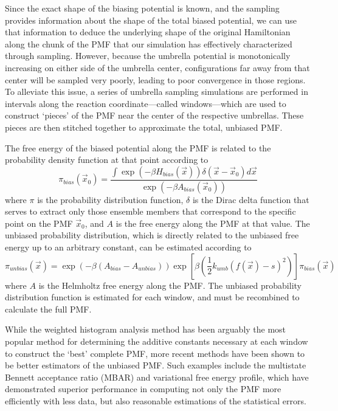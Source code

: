 Since the exact shape of the biasing potential is known, and the sampling
provides information about the shape of the total biased potential, we can use
that information to deduce the underlying shape of the original Hamiltonian
along the chunk of the PMF that our simulation has effectively characterized
through sampling. However, because the umbrella potential is monotonically
increasing on either side of the umbrella center, configurations far away from
that center will be sampled very poorly, leading to poor convergence in those
regions. To alleviate this issue, a series of umbrella sampling simulations are
performed in intervals along the reaction coordinate---called windows---which
are used to construct `pieces' of the PMF near the center of the respective
umbrellas. These pieces are then stitched together to approximate the total,
unbiased PMF.

The free energy of the biased potential along the PMF is related to the
probability density function at that point according to
\begin{equation*}
   \pi_{bias}(\vec{x}_0) = \frac {\int \exp \left( -\beta H_{bias} (\vec{x})
         \right) \delta (\vec{x} - \vec{x}_0) d\vec{x}}
         {\exp\left(-\beta A_{bias}(\vec{x}_0)\right)}
\end{equation*}
where $\pi$ is the probability distribution function, $\delta$ is the Dirac
delta function that serves to extract only those ensemble members that
correspond to the specific point on the PMF $\vec{x}_0$, and $A$ is the free
energy along the PMF at that value. The unbiased probability distribution, which
is directly related to the unbiased free energy up to an arbitrary constant, can
be estimated according to \cite{Tuckerman_Book_StatMech_TheoryAndSim}
\begin{equation*}
   \pi_{unbias}(\vec{x}) = \exp\left(-\beta(A_{bias}-A_{unbias}) \right)
                  \exp\left[\beta\left(\frac 1 2 k_{umb}(f(\vec{x})-s)^2 \right)
                  \right] \pi_{bias}(\vec{x})
\end{equation*}
where $A$ is the Helmholtz free energy along the PMF. The unbiased probability
distribution function is estimated for each window, and must be recombined to
calculate the full PMF. \cite{Tuckerman_Book_StatMech_TheoryAndSim}

While the weighted histogram analysis method has been arguably the most popular
method for determining the additive constants necessary at each window to
construct the `best' complete PMF, \cite{Grossfield_WHAM_2005} more recent
methods have been shown to be better estimators of the unbiased PMF. Such
examples include the multistate Bennett acceptance ratio (MBAR)
\cite{Shirts_JChemPhys_2008_v129_p124105} and variational free energy
profile, \cite{Lee_JChemTheoryComput_2013_v9_p153} which have demonstrated
superior performance in computing not only the PMF more efficiently with less
data, \cite{Lee_JChemTheoryComput_2013_v9_p153} but also reasonable estimations
of the statistical errors. \cite{Shirts_JChemPhys_2008_v129_p124105}

